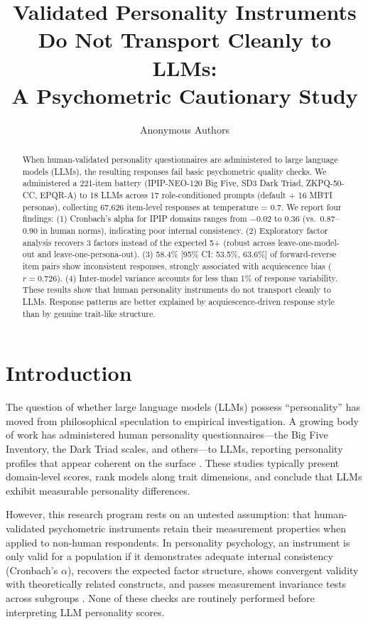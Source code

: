 \documentclass[11pt]{article}
\title{Validated Personality Instruments Do Not Transport Cleanly to LLMs:\\ A Psychometric Cautionary Study}
\author{Anonymous Authors}
\date{}
\begin{document}
\maketitle

\begin{abstract}
When human-validated personality questionnaires are administered to large language models (LLMs), the resulting responses fail basic psychometric quality checks. We administered a 221-item battery (IPIP-NEO-120 Big Five, SD3 Dark Triad, ZKPQ-50-CC, EPQR-A) to 18 LLMs across 17 role-conditioned prompts (default + 16 MBTI personas), collecting 67,626 item-level responses at temperature = 0.7. We report four findings: (1) Cronbach's alpha for IPIP domains ranges from $-0.02$ to $0.36$ (vs.\ $0.87$--$0.90$ in human norms), indicating poor internal consistency. (2) Exploratory factor analysis recovers 3 factors instead of the expected 5+ (robust across leave-one-model-out and leave-one-persona-out). (3) 58.4\% [95\% CI: 53.5\%, 63.6\%] of forward-reverse item pairs show inconsistent responses, strongly associated with acquiescence bias ($r = 0.726$). (4) Inter-model variance accounts for less than 1\% of response variability. These results show that human personality instruments do not transport cleanly to LLMs. Response patterns are better explained by acquiescence-driven response style than by genuine trait-like structure.
\end{abstract}

\section{Introduction}

The question of whether large language models (LLMs) possess ``personality'' has moved from philosophical speculation to empirical investigation. A growing body of work has administered human personality questionnaires---the Big Five Inventory, the Dark Triad scales, and others---to LLMs, reporting personality profiles that appear coherent on the surface \citep{miotto2023gpt3, bhandari2025evaluating, serapio2025psychometric}. These studies typically present domain-level scores, rank models along trait dimensions, and conclude that LLMs exhibit measurable personality differences.

However, this research program rests on an untested assumption: that human-validated psychometric instruments retain their measurement properties when applied to non-human respondents. In personality psychology, an instrument is only valid for a population if it demonstrates adequate internal consistency (Cronbach's $\alpha$), recovers the expected factor structure, shows convergent validity with theoretically related constructs, and passes measurement invariance tests across subgroups \citep{cronbach1951coefficient, lord1968statistical}. None of these checks are routinely performed before interpreting LLM personality scores.
\end{document}
